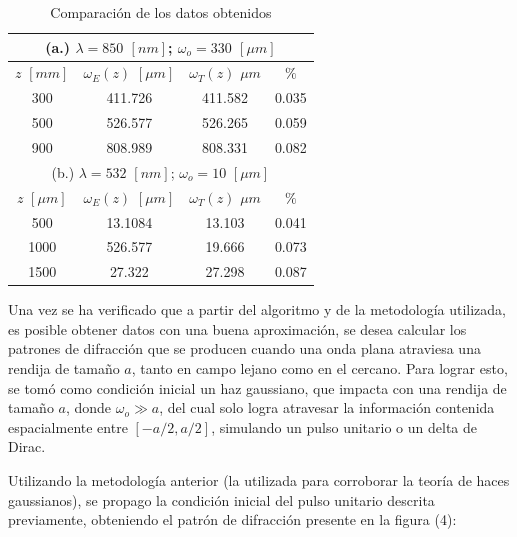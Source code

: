\documentclass[11pt,letterpaper,twocolumn]{article}
\begin{document}
\begin{table}[h!]
\begin{center}
\begin{tabular}{|c|c|c|c|}
  \hline
  \multicolumn{4}{|c|}{(a.) $\lambda=850$ $[nm]$; $\omega_{o}= 330$ $[\mu m]$ } \\ 
  \hline 
  $z$ $[mm]$ & $\omega_{E}(z)$ $[\mu m]$ & $\omega_{T}(z)$ $\mu m$ & $\%$ \\ 
  \hline 
  300 & 411.726 & 411.582 & 0.035 \\ 
  \hline 
  500 & 526.577 & 526.265 & 0.059\\ 
  \hline 
  900 & 808.989 & 808.331 & 0.082 \\ 
  \hline 
  \multicolumn{4}{|c|}{(b.) $\lambda=532$ $[nm]$; $\omega_{o}= 10$ $[\mu m]$ } \\ 
  \hline 
  $z$ $[\mu m]$ & $\omega_{E}(z)$ $[\mu m]$ & $\omega_{T}(z)$ $\mu m$ & $\%$ \\ 
  \hline 
  500 & 13.1084 &  13.103 & 0.041 \\ 
  \hline 
  1000 & 526.577 & 19.666 & 0.073\\ 
  \hline 
  1500 & 27.322 & 27.298 & 0.087 \\ 
  \hline 
 \end{tabular}  
 \caption{Comparación de los datos obtenidos}
\end{center}
\end{table}
\par
Una vez se ha verificado que a partir del algoritmo y de la metodología utilizada, es posible obtener datos con una buena aproximación, se desea calcular los patrones de difracción que se producen cuando una onda plana atraviesa una rendija de tamaño $a$, tanto en campo lejano como en el cercano. Para lograr esto, se tomó como condición inicial un haz gaussiano, que impacta con una rendija de tamaño $a$, donde $\omega_{o} \gg a$, del cual solo logra atravesar la información contenida espacialmente entre $[-a/2,a/2]$, simulando un pulso unitario o un delta de Dirac.\\
\par 
Utilizando la metodología anterior (la utilizada para corroborar la teoría de haces gaussianos), se propago la condición inicial del pulso unitario descrita previamente, obteniendo el patrón de difracción presente en la figura (4):
\end{document}
